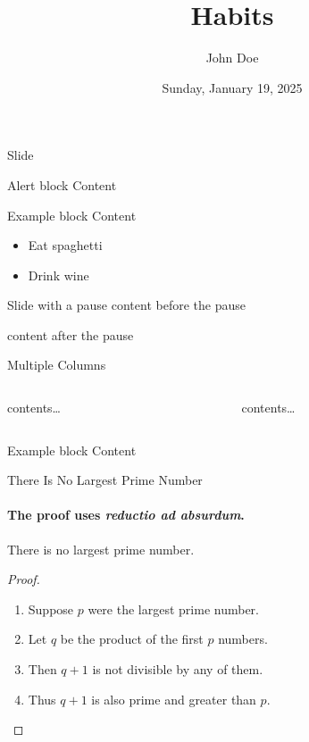 \documentclass[
  ignorenonframetext,
  aspectratio=32,
]{beamer}
\title{Habits}
\author{John Doe}
\date{Sunday, January 19, 2025}
\providecommand{\tightlist}{%
  \setlength{\itemsep}{0pt}\setlength{\parskip}{0pt}}\usepackage{longtable,booktabs,array}
\begin{document}
\frame{\titlepage}



\begin{frame}{Slide}
\label{slide}
\begin{alertblock}{Alert block}
\label{alert-block}
Content
\end{alertblock}

\begin{exampleblock}{Example block}
\label{example-block}
Content

\begin{itemize}[<+->]
\tightlist
\item
  Eat spaghetti
\item
  Drink wine
\end{itemize}
\end{exampleblock}
\end{frame}

\begin{frame}{Slide with a pause}
\label{slide-with-a-pause}
content before the pause

\pause

content after the pause
\end{frame}

\begin{frame}{Multiple Columns}
\label{multiple-columns}
\begin{columns}[T]
\begin{column}{0.4\linewidth}
contents\ldots{}
\end{column}

\begin{column}{0.6\linewidth}
contents\ldots{}
\end{column}
\end{columns}

\begin{exampleblock}{Example block}
\label{example-block-1}
Content
\end{exampleblock}
\end{frame}

\begin{frame}{There Is No Largest Prime Number}
\label{there-is-no-largest-prime-number}
\framesubtitle{The proof uses \textit{reductio ad absurdum}.}
\begin{theorem}
There is no largest prime number.
\end{theorem}
\begin{proof}
\begin{enumerate}
\item<1-| alert@1> Suppose $p$ were the largest prime number.
\item<2-> Let $q$ be the product of the first $p$ numbers.
\item<3-> Then $q+1$ is not divisible by any of them.
\item<1-> Thus $q+1$ is also prime and greater than $p$.\qedhere
\end{enumerate}
\end{proof}
\end{frame}
\end{document}
